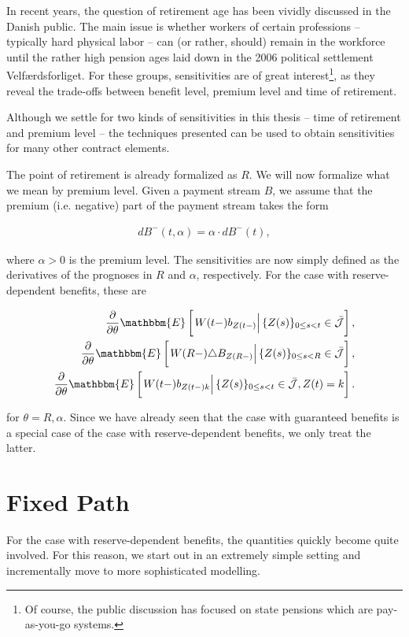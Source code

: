 \documentclass{book}
\newcommand{\1}[1]{\mathbbm{1}_{\left\lbrace #1 \right\rbrace}}
\newcommand{\econd}[2][def]{\mathbbm{E} \left[ \left. #1 \right| #2 \right]}
\theoremstyle{break}
\theoremstyle{remark}
\numberwithin{equation}{section}
\begin{document}
In recent years, the question of retirement age has been vividly discussed in the Danish public. The main issue is whether workers of certain professions -- typically hard physical labor -- can (or rather, should) remain in the workforce until the rather high pension ages laid down in the 2006 political settlement Velfærdsforliget. For these groups, sensitivities are of great interest\footnote{Of course, the public discussion has focused on state pensions which are pay-as-you-go systems.}, as they reveal the trade-offs between benefit level, premium level and time of retirement.

Although we settle for two kinds of sensitivities in this thesis -- time of retirement and premium level -- the techniques presented can be used to obtain sensitivities for many other contract elements.

The point of retirement is already formalized as $R$. We will now formalize what we mean by premium level. Given a payment stream $B$, we assume that the premium (i.e. negative) part of the payment stream takes the form

\begin{align*}
	dB^-(t, \alpha) = \alpha \cdot dB^-(t),
\end{align*}

where $\alpha>0$ is the premium level. The sensitivities are now simply defined as the derivatives of the prognoses in $R$ and $\alpha$, respectively. For the case with reserve-dependent benefits, these are

\begin{align*}
	\frac{\partial}{\partial \theta} \econd[W(t-)b_{Z(t-)}]{\{Z(s) \}_{0 \leq s < t} \in \bar{\mathcal{J}}}, \\
	\frac{\partial}{\partial \theta} \econd[W(R-) \triangle B_{Z(R-)}]{\{Z(s) \}_{0 \leq s < R} \in \bar{\mathcal{J}}}, \\
	\frac{\partial}{\partial \theta} \econd[W(t-)b_{Z(t-)k}]{\{Z(s) \}_{0 \leq s < t} \in \bar{\mathcal{J}}, Z(t) = k}.
\end{align*}

for  $\theta = R,\alpha$. Since we have already seen that the case with guaranteed benefits is a special case of the case with reserve-dependent benefits, we only treat the latter.

\section{Fixed Path}

For the case with reserve-dependent benefits, the quantities quickly become quite involved. For this reason, we start out in an extremely simple setting and incrementally move to more sophisticated modelling.
\end{document}

